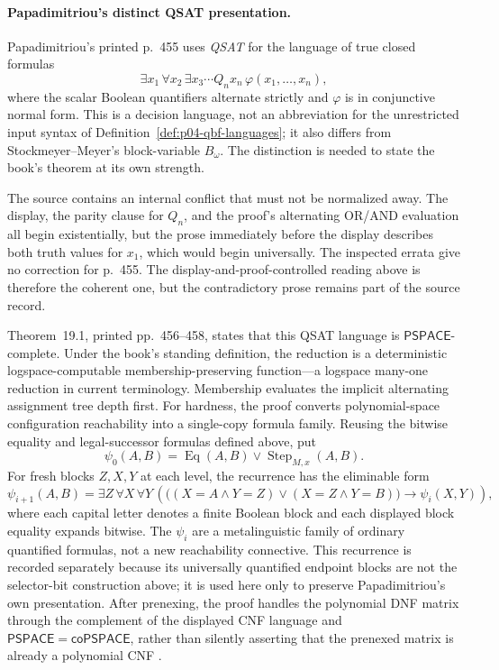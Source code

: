 \paragraph{Papadimitriou's distinct QSAT presentation.}
Papadimitriou's printed p.~455 uses \emph{QSAT} for the language of true closed
formulas
\[
 \exists x_1\,\forall x_2\,\exists x_3\cdots Q_n x_n\,
 \varphi(x_1,\ldots,x_n),
\]
where the scalar Boolean quantifiers alternate strictly and \(\varphi\) is in
conjunctive normal form.  This is a decision language, not an abbreviation for
the unrestricted input syntax of Definition~\ref{def:p04-qbf-languages}; it
also differs from Stockmeyer--Meyer's block-variable \(B_\omega\).  The
distinction is needed to state the book's theorem at its own strength.

The source contains an internal conflict that must not be normalized away.
The display, the parity clause for \(Q_n\), and the proof's alternating
OR/AND evaluation all begin existentially, but the prose immediately before
the display describes both truth values for \(x_1\), which would begin
universally.  The inspected errata give no correction for p.~455.  The
display-and-proof-controlled reading above is therefore the coherent one, but
the contradictory prose remains part of the source record.

Theorem~19.1, printed pp.~456--458, states that this QSAT language is
\(\mathsf{PSPACE}\)-complete.  Under the book's standing definition, the
reduction is a deterministic logspace-computable membership-preserving
function---a logspace many-one reduction in current terminology.  Membership
evaluates the implicit alternating assignment tree depth first.  For hardness,
the proof converts polynomial-space configuration reachability into a
single-copy formula family.  Reusing the bitwise equality and legal-successor
formulas defined above, put
\[
 \psi_0(A,B)=\operatorname{Eq}(A,B)\lor
              \operatorname{Step}_{M,x}(A,B).
\]
For fresh blocks \(Z,X,Y\) at each level, the recurrence has the eliminable
form
\[
 \psi_{i+1}(A,B)=
 \exists Z\,\forall X\,\forall Y\,
 \left(
   \bigl((X=A\land Y=Z)\lor(X=Z\land Y=B)\bigr)
   \to \psi_i(X,Y)
 \right),
\]
where each capital letter denotes a finite Boolean block and each displayed
block equality expands bitwise.  The \(\psi_i\) are a metalinguistic family of
ordinary quantified formulas, not a new reachability connective.  This
recurrence is recorded separately because its universally quantified endpoint
blocks are not the selector-bit construction above; it is used here only to
preserve Papadimitriou's own presentation.  After prenexing, the proof handles
the polynomial DNF matrix through the complement of the displayed CNF language
and \(\mathsf{PSPACE}=\mathsf{coPSPACE}\), rather than silently asserting that
the prenexed matrix is already a polynomial CNF
\cite[pp.~455--458]{Papadimitriou1994}.

